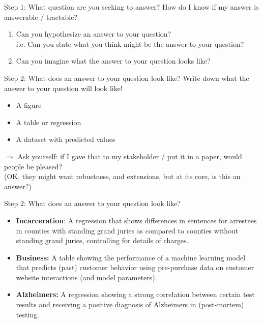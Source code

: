 \documentclass[11pt]{beamer}
\begin{document}
\begin{frame}[c]{Step 1: What \alert{question} are you seeking to answer?}
How do I know if my answer is answerable / tractable?

\begin{enumerate}
  \pause \item Can you hypothesize an answer to your question? \\
  i.e. Can you state what you think might be the answer to your question?
  \pause \item Can you imagine what the answer to your question looks like?
\end{enumerate}
\end{frame}

\begin{frame}[c]{Step 2: What does \alert{an answer} to your question look like?}
\alert{Write down} what the answer to your question will look like!
\pause
\begin{itemize}
  \item A figure
  \item A table or regression
  \item A dataset with predicted values
\end{itemize}
\pause
$\Rightarrow$ Ask yourself: if I gave that to my stakeholder / put it in a paper, would people be pleased?\\
\pause (OK, they might want robustness, and extensions, but at its core, is this an answer?)
\end{frame}

\begin{frame}[c]{Step 2: What does \alert{an answer} to your question look like?}
  \begin{itemize}
    \pause \item \textbf{Incarceration}: A regression that shows differences in sentences for arrestees in counties with standing grand juries as compared to counties without standing grand juries, controlling for details of charges.
    \pause \item \textbf{Business:} A table showing the performance of a machine learning model that predicts (past) customer behavior using pre-purchase data on customer website interactions (and model parameters).
    \pause \item \textbf{Alzheimers:} A regression showing a strong correlation between certain test results and receiving a positive diagnosis of Alzheimers in (post-mortem) testing.
  \end{itemize}
\end{frame}
\end{document}
